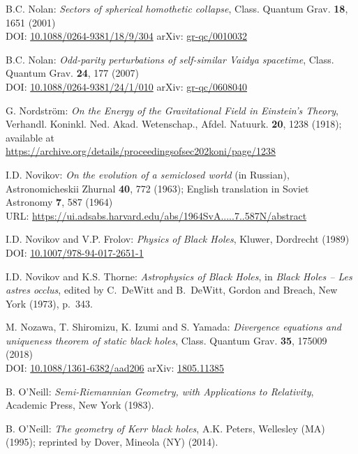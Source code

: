 \begin{thebibliography}{123}
B.C. Nolan:
{\em Sectors of spherical homothetic collapse},
Class. Quantum Grav. {\bf 18}, 1651 (2001)\\
DOI: \href{https://doi.org/10.1088/0264-9381/18/9/304}{10.1088/0264-9381/18/9/304}\hfill
arXiv: \href{https://arxiv.org/abs/gr-qc/0010032}{gr-qc/0010032}

B.C. Nolan:
{\em Odd-parity perturbations of self-similar Vaidya spacetime},
Class. Quantum Grav. {\bf 24}, 177 (2007)\\
DOI: \href{https://doi.org/10.1088/0264-9381/24/1/010}{10.1088/0264-9381/24/1/010}\hfill
arXiv: \href{https://arxiv.org/abs/gr-qc/0608040}{gr-qc/0608040}

G. Nordström:
{\em On the Energy of the Gravitational Field in Einstein's Theory},
Verhandl. Koninkl. Ned. Akad. Wetenschap., Afdel. Natuurk. {\bf 20}, 1238 (1918);
available at\\
\url{https://archive.org/details/proceedingsofsec202koni/page/1238}

I.D. Novikov:
{\em On the evolution of a semiclosed world} (in Russian),
Astronomicheskii Zhurnal {\bf 40}, 772 (1963); English translation in
Soviet Astronomy {\bf 7}, 587 (1964)\\
URL: \url{https://ui.adsabs.harvard.edu/abs/1964SvA.....7..587N/abstract}

I.D. Novikov and V.P. Frolov: {\em Physics of Black Holes},
Kluwer, Dordrecht (1989)\\
DOI: \href{https://doi.org/10.1007/978-94-017-2651-1}{10.1007/978-94-017-2651-1}

I.D. Novikov and K.S. Thorne: {\em Astrophysics of Black Holes},
in {\em Black Holes -- Les astres occlus},  edited by C.~DeWitt and B.~DeWitt,
Gordon and Breach, New York (1973), p.~343.

M. Nozawa, T. Shiromizu, K. Izumi and S. Yamada:
{\em Divergence equations and uniqueness theorem of static black holes},
Class. Quantum Grav. {\bf 35}, 175009 (2018)\\
DOI: \href{https://doi.org/10.1088/1361-6382/aad206}{10.1088/1361-6382/aad206}\hfill
arXiv: \href{https://arxiv.org/abs/1805.11385}{1805.11385}

B. O'Neill: {\em Semi-Riemannian Geometry, with Applications to Relativity},
Academic Press, New York (1983).

B. O'Neill: {\em The geometry of Kerr black holes}, A.K. Peters, Wellesley (MA) (1995);
reprinted by Dover, Mineola (NY) (2014).


\end{thebibliography}
